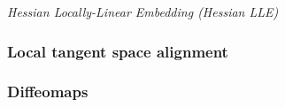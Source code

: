 \documentclass[journal, a4paper]{IEEEtran}
\begin{document}
%	
%	


\textit{Hessian Locally-Linear Embedding (Hessian LLE)}



\subsubsection{Local tangent space alignment}

%


\subsubsection{Diffeomaps}
\end{document}
